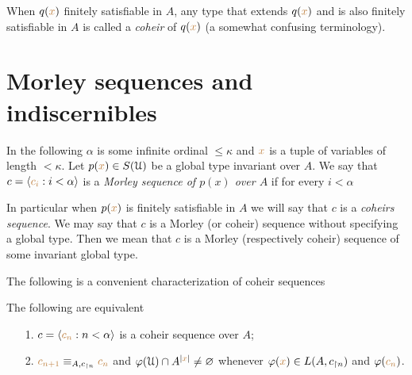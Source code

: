 \documentclass[creche.tex]{subfiles}
\begin{document}
When $q({\color{brown} x})$ finitely satisfiable in $A$, any type that extends $q({\color{brown} x})$ and is also finitely satisfiable in $A$ is called a \emph{coheir} of $q({\color{brown} x})$  (a somewhat confusing terminology).


\section{Morley sequences and indiscernibles}


In the following $\alpha$ is some infinite ordinal $\le\kappa$ and ${\color{brown} x}$ is a tuple of variables of length $<\kappa$. Let \mbox{$p({\color{brown} x})\in S(\EuScript U)$} be a global type invariant over $A$.   We say that $c=\langle{\color{brown}c_i}:i<\alpha\rangle$ is a \emph{Morley sequence of $p(x)$ over $A$\/} if for every $i<\alpha$


In particular when $p({\color{brown} x})$ is finitely satisfiable in $A$ we will say that $c$ is a \emph{coheirs sequence}. We may say that $c$ is a Morley (or coheir) sequence without specifying a global type. Then we mean that $c$ is a Morley (respectively coheir) sequence of some invariant global type.

The following is a convenient characterization of coheir sequences

\begin{lemma}\label{lem_coheir_property}
The following are equivalent
\begin{itemize}
\item[1.] $c=\langle{\color{brown}c_n}:n<\alpha\rangle$ is a coheir sequence over $A$;
\item[2.] ${\color{brown} c_{n+1}}\equiv_{A,c_{\restriction n}}{\color{brown} c_n}$ and $\varphi(\EuScript U)\cap A^{|{\color{brown} x}|}\neq\varnothing$ whenever $\varphi({\color{brown} x})\in L(A,c_{\restriction n})$ and  $\varphi({\color{brown} c_n})$.
\end{itemize}
\end{lemma}
\end{document}
